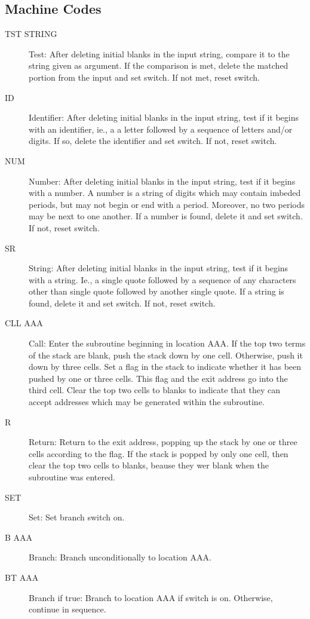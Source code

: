 \documentclass[twocolumn]{article}
\begin{document}
\subsection{Machine Codes}
\begin{description}
\item[TST STRING] Test: After deleting initial blanks in the input string, compare it to the string given as argument. If the comparison is met, delete the matched portion from the input and set switch. If not met, reset switch.
\item[ID] Identifier: After deleting initial blanks in the input string, test if it begins with an identifier, ie., a a letter followed by a sequence of letters and/or digits. If so, delete the identifier and set switch. If not, reset switch.
\item[NUM] Number: After deleting initial blanks in the input string, test if it begins with a number. A number is a string of digits which may contain imbeded periods, but may not begin or end with a period.  Moreover, no two periods may be next to one another. If a number is found, delete it and set switch. If not, reset switch.
\item[SR] String: After deleting initial blanks in the input string, test if
it begins with a string. Ie., a single quote followed by a sequence of any
characters other than single quote followed by another single quote.
If a string is found, delete it and set switch.
If not, reset switch.
\item[CLL AAA] Call: Enter the subroutine beginning in location AAA.
If the top two terms of the stack are blank, push the stack down by one cell.
Otherwise, push it down by three cells.
Set a flag in the stack to indicate whether it has been pushed by one
or three cells.
This flag and the exit address go into the third cell.
Clear the top two cells to blanks to indicate that they can accept addresses
which may be generated within the subroutine.
\item[R] Return: Return to the exit address, popping up the stack by one
or three cells according to the flag.
If the stack is popped by only one cell, then clear the top two cells to
blanks, beause they wer blank when the subroutine was entered.
\item[SET] Set: Set branch switch on.
\item[B   AAA] Branch: Branch unconditionally to location AAA.
\item[BT  AAA] Branch if true: Branch to location AAA if switch is on.
Otherwise, continue in sequence.

\end{description}
\end{document}
